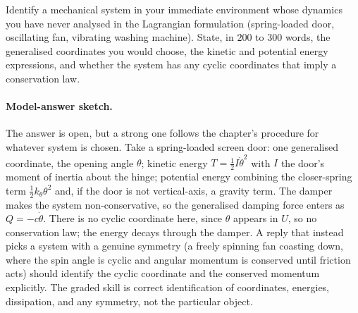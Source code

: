 \begin{exercise}
Identify a mechanical system in your immediate environment whose
dynamics you have never analysed in the Lagrangian formulation
(spring-loaded door, oscillating fan, vibrating washing machine).
State, in $200$ to $300$ words, the generalised coordinates you
would choose, the kinetic and potential energy expressions, and
whether the system has any cyclic coordinates that imply a
conservation law.

\paragraph{Model-answer sketch.} The answer is open, but a strong one
follows the chapter's procedure for whatever system is chosen. Take a
spring-loaded screen door: one generalised coordinate, the opening angle
$\theta$; kinetic energy $T = \tfrac12 I\dot\theta^2$ with $I$ the
door's moment of inertia about the hinge; potential energy combining the
closer-spring term $\tfrac12 k_\theta\theta^2$ and, if the door is not
vertical-axis, a gravity term. The damper makes the system
non-conservative, so the generalised damping force enters as
$Q = -c\dot\theta$. There is no cyclic coordinate here, since $\theta$
appears in $U$, so no conservation law; the energy decays through the
damper. A reply that instead picks a system with a genuine symmetry (a
freely spinning fan coasting down, where the spin angle is cyclic and
angular momentum is conserved until friction acts) should identify the
cyclic coordinate and the conserved momentum explicitly. The graded
skill is correct identification of coordinates, energies, dissipation,
and any symmetry, not the particular object.
\end{exercise}
